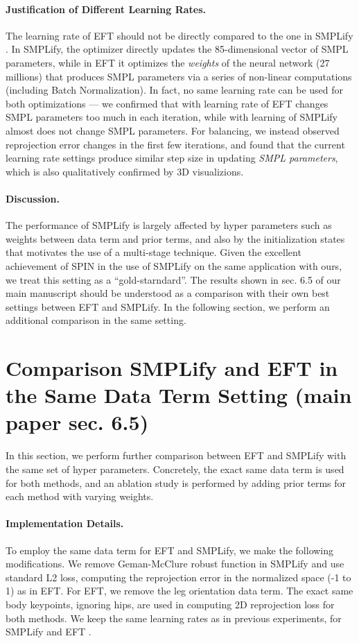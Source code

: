 \documentclass[10pt,twocolumn,letterpaper]{article}
\begin{document}
	\paragraph{Justification of Different Learning Rates.} The learning rate of EFT  should not be directly compared to the one in SMPLify . In SMPLify, the optimizer directly updates the 85-dimensional vector of SMPL parameters, while in EFT it optimizes the \emph{weights} of the neural network (27 millions) that produces SMPL parameters via a series of non-linear computations (including Batch Normalization). In fact, no same learning rate can be used for both optimizations --- we confirmed that with learning rate of  EFT changes SMPL parameters too much in each iteration, while with learning of  SMPLify almost does not change SMPL parameters. For balancing, we instead observed reprojection error changes in the first few iterations, and found that the current learning rate settings produce similar step size in updating \emph{SMPL parameters}, which is also qualitatively confirmed by 3D visualizions.
	
	\paragraph{Discussion.}
	The performance of SMPLify is largely affected by hyper parameters such as weights between data term and prior terms, and also by the initialization states that motivates the use of a multi-stage technique. Given the excellent achievement of SPIN in the use of SMPLify on the same application with ours, we treat this setting as a ``gold-starndard''. The results shown in sec. 6.5 of our main manuscript should be understood as a comparison with their own best settings between EFT and SMPLify. In the following section, we perform an additional comparison in the same setting.
	
	
	\section{Comparison SMPLify and EFT in the Same Data Term Setting (main paper sec. 6.5)}\label{ss:apple-to-apple}
	
	In this section, we perform further comparison between EFT and SMPLify with the same set of hyper parameters. Concretely, the exact same data term is used for both methods, and an ablation study is performed by adding prior terms for each method with varying weights.
	
	\paragraph{Implementation Details.} 
	To employ the same data term for EFT and SMPLify, we make the following modifications. We remove Geman-McClure robust function in SMPLify and use standard L2 loss, computing the reprojection error in the normalized space (-1 to 1) as in EFT. For EFT, we remove the leg orientation data term. The exact same body keypoints, ignoring hips, are used in computing 2D reprojection loss for both methods. 
We keep the same learning rates as in previous experiments,  for SMPLify and EFT .
	
\end{document}
